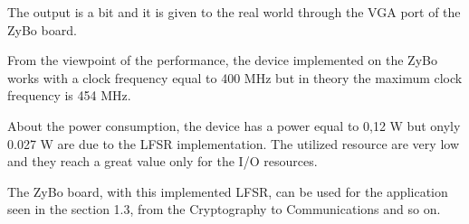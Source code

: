\documentclass[a4paper]{report}
\begin{document}
\noindent The output is a bit and it is given to the real world through the VGA port of the ZyBo board.

\noindent From the viewpoint of the performance, the device implemented on the ZyBo works with a clock frequency equal to 400 MHz but in theory the maximum clock frequency is 454 MHz.

\noindent About the power consumption, the device has a power equal to 0,12 W but onyly 0.027 W are due to the LFSR implementation. The utilized resource are very low and they reach a great value only for the I/O resources.

\noindent The ZyBo board, with this implemented LFSR, can be used for the application seen in the section 1.3, from the Cryptography to Communications and so on.
\end{document}
